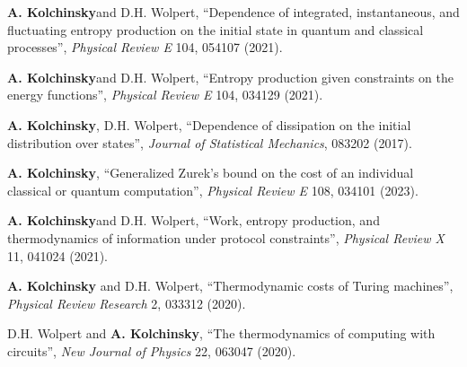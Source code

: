 \textbf{A. Kolchinsky}\CA and D.H. Wolpert, ``Dependence of integrated, instantaneous, and fluctuating entropy production on the initial state in quantum and classical processes'', \emph{Physical Review E} 104, 054107 (2021).  

\textbf{A. Kolchinsky}\CA and D.H. Wolpert, ``Entropy production given constraints on the energy functions'', \emph{Physical Review E} 104, 034129 (2021).  

\textbf{A. Kolchinsky}\CA, D.H. Wolpert, ``Dependence of dissipation on the initial distribution over states'', \emph{Journal of Statistical Mechanics}, 083202 (2017).   


\vspace{15pt}

\textbf{A. Kolchinsky}\CA, ``Generalized Zurek's bound on the cost of an individual classical or quantum computation'', \emph{Physical Review E} 108, 034101 (2023).   %

\textbf{A. Kolchinsky}\CA and D.H. Wolpert, ``Work, entropy production, and thermodynamics of information under protocol constraints'', \emph{Physical Review X} 11, 041024 (2021).   %

\textbf{A. Kolchinsky} and D.H. Wolpert, ``Thermodynamic costs of Turing machines'', \emph{Physical Review Research} 2, 033312 (2020).    %

D.H. Wolpert and \textbf{A. Kolchinsky}, ``The thermodynamics of computing with circuits'', \emph{New Journal of Physics} 22, 063047 (2020).   %

